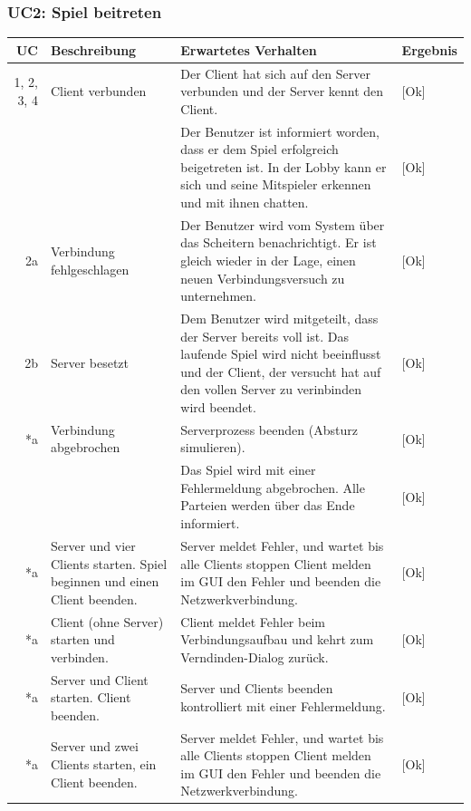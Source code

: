 \documentclass[12pt,halfparskip]{scrartcl}
\begin{document}
\newpage

\subsubsection{UC2: Spiel beitreten}
	\begin {tabular}{r | p{3cm} | p{8cm} | l}
		\toprule
		\textbf{UC} & \textbf{Beschreibung} & \textbf{Erwartetes Verhalten} & \textbf{Ergebnis} \\
		\midrule
		1, 2, 3, 4 & Client verbunden & Der Client hat sich auf den Server verbunden und der Server kennt den Client. & [Ok] \\
		 \cline{3-4} & & Der Benutzer ist informiert worden, dass er dem Spiel erfolgreich beigetreten ist. In der Lobby kann er sich und seine Mitspieler erkennen und mit ihnen chatten. & [Ok] \\
		\midrule
		2a & Verbindung fehlgeschlagen & Der Benutzer wird vom System über das Scheitern benachrichtigt. Er ist gleich wieder in der Lage, einen neuen Verbindungsversuch zu unternehmen. & [Ok] \\
		\midrule
		2b & Server besetzt & Dem Benutzer wird mitgeteilt, dass der Server bereits voll ist. Das laufende Spiel wird nicht beeinflusst und der Client, der versucht hat auf den vollen Server zu verinbinden wird beendet. & [Ok] \\
		\midrule
		*a & Verbindung abgebrochen & Serverprozess beenden (Absturz simulieren). & [Ok]  \\
		\cline{3-4} & & Das Spiel wird mit einer Fehlermeldung abgebrochen. Alle Parteien werden über das Ende informiert. & [Ok] \\
		\midrule
		*a & Server und vier Clients starten. Spiel beginnen und einen Client beenden. & Server meldet Fehler, und wartet bis alle Clients stoppen Client melden im GUI den Fehler und beenden die Netzwerkverbindung. & [Ok] \\
		\midrule
		*a & Client (ohne Server) starten und verbinden. & Client meldet Fehler beim Verbindungsaufbau und kehrt zum Verndinden-Dialog zurück. & [Ok] \\
		\midrule
		*a & Server und Client starten. Client beenden. & Server und Clients beenden kontrolliert mit einer Fehlermeldung. & [Ok] \\
		\midrule
		*a & Server und zwei Clients starten, ein Client beenden. & Server meldet Fehler, und wartet bis alle Clients stoppen Client melden im GUI den Fehler und beenden die Netzwerkverbindung. & [Ok]  \\
		\bottomrule
	\end{tabular}
	
\end{document}
